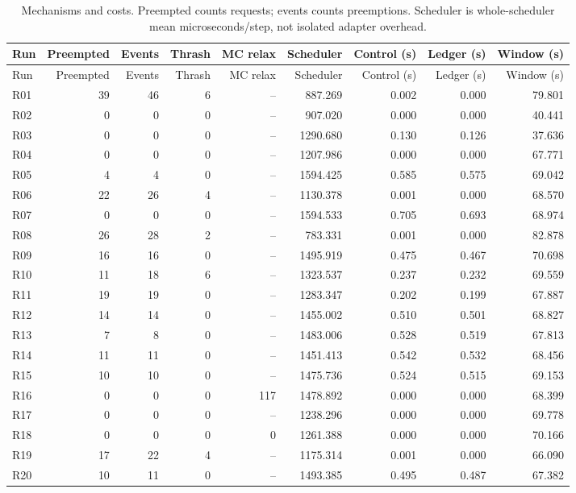 \begin{longtable}{lrrrrrrrr}
\caption{Mechanisms and costs. Preempted counts requests; events counts preemptions. Scheduler is whole-scheduler mean microseconds/step, not isolated adapter overhead.}\\
\toprule
Run & Preempted & Events & Thrash & MC relax & Scheduler & Control (s) & Ledger (s) & Window (s)\\\midrule\endfirsthead
\toprule
Run & Preempted & Events & Thrash & MC relax & Scheduler & Control (s) & Ledger (s) & Window (s)\\\midrule\endhead
\bottomrule\endfoot
R01 & 39 & 46 & 6 & -- & 887.269 & 0.002 & 0.000 & 79.801\\
R02 & 0 & 0 & 0 & -- & 907.020 & 0.000 & 0.000 & 40.441\\
R03 & 0 & 0 & 0 & -- & 1290.680 & 0.130 & 0.126 & 37.636\\
R04 & 0 & 0 & 0 & -- & 1207.986 & 0.000 & 0.000 & 67.771\\
R05 & 4 & 4 & 0 & -- & 1594.425 & 0.585 & 0.575 & 69.042\\
R06 & 22 & 26 & 4 & -- & 1130.378 & 0.001 & 0.000 & 68.570\\
R07 & 0 & 0 & 0 & -- & 1594.533 & 0.705 & 0.693 & 68.974\\
R08 & 26 & 28 & 2 & -- & 783.331 & 0.001 & 0.000 & 82.878\\
R09 & 16 & 16 & 0 & -- & 1495.919 & 0.475 & 0.467 & 70.698\\
R10 & 11 & 18 & 6 & -- & 1323.537 & 0.237 & 0.232 & 69.559\\
R11 & 19 & 19 & 0 & -- & 1283.347 & 0.202 & 0.199 & 67.887\\
R12 & 14 & 14 & 0 & -- & 1455.002 & 0.510 & 0.501 & 68.827\\
R13 & 7 & 8 & 0 & -- & 1483.006 & 0.528 & 0.519 & 67.813\\
R14 & 11 & 11 & 0 & -- & 1451.413 & 0.542 & 0.532 & 68.456\\
R15 & 10 & 10 & 0 & -- & 1475.736 & 0.524 & 0.515 & 69.153\\
R16 & 0 & 0 & 0 & 117 & 1478.892 & 0.000 & 0.000 & 68.399\\
R17 & 0 & 0 & 0 & -- & 1238.296 & 0.000 & 0.000 & 69.778\\
R18 & 0 & 0 & 0 & 0 & 1261.388 & 0.000 & 0.000 & 70.166\\
R19 & 17 & 22 & 4 & -- & 1175.314 & 0.001 & 0.000 & 66.090\\
R20 & 10 & 11 & 0 & -- & 1493.385 & 0.495 & 0.487 & 67.382\\

\end{longtable}
